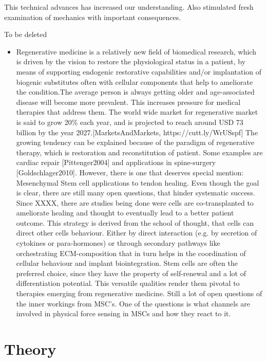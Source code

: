 This technical advances has increased our understanding. Also stimulated fresh examination of mechanics with important consequences.


To be deleted 
\begin{itemize}
    \item Regenerative medicine is a relatively new field of biomedical research, which is driven by the vision to restore the physiological status in a patient, by means of supporting endogenic restorative capabilities and/or implantation of biogenic substitutes often with cellular components that help to ameliorate the condition.The average person is always getting older and age-associated disease will become more prevalent. This increases pressure for medical therapies that address them. The world wide market for regenerative market is said to grow 20\% each year, and is projected to reach around USD 73 billion by the year 2027.[MarketsAndMarkets, https://cutt.ly/WrUSspf] The growing tendency can be explained because of the paradigm of regenerative therapy, which is restoration and reconstitution of patient. Some examples are cardiac repair [Pittenger2004] and applications in spine-surgery [Goldschlager2010]. However, there is one that deserves special mention: Mesenchymal Stem cell applications to tendon healing. Even though the goal is clear, there are still many open questions, that hinder systematic success. Since XXXX, there are studies being done were cells are co-transplanted to ameliorate healing and thought to eventually lead to a better patient outcome. This strategy is derived from the school of thought, that cells can direct other cells behaviour. Either by direct interaction (e.g. by secretion of cytokines or para-hormones) or through secondary pathways like orchestrating ECM-composition that in turn helps in the coordination of cellular behaviour and implant biointegration. Stem cells are often the preferred choice, since they have the property of self-renewal and a lot of differentiation potential. 
 This versatile qualities render them pivotal to therapies emerging from regenerative medicine. Still a lot of open questions of the inner workings from MSC's. One of the questions is what channels are involved in physical force sensing in MSCs and how they react to it. 
\end{itemize}


\section{Theory}

